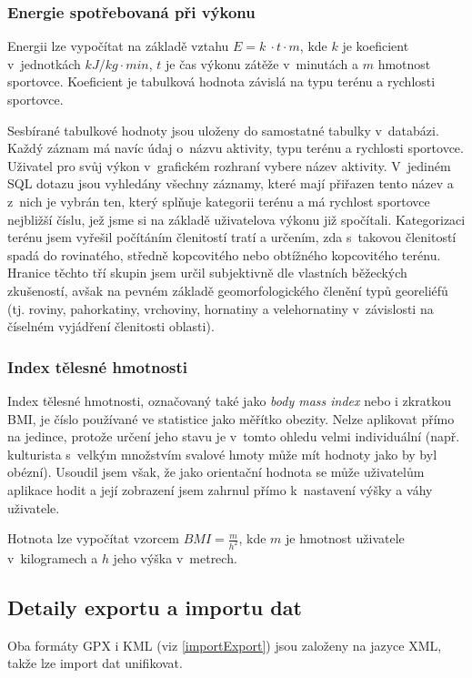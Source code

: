\subsubsection{Energie spotřebovaná při výkonu}
Energii lze vypočítat na základě vztahu $E = k~\cdot t \cdot m$, kde
$k$ je koeficient v~jednotkách $kJ / kg \cdot min$,
$t$ je čas výkonu zátěže v~minutách a $m$
hmotnost sportovce. Koeficient je tabulková hodnota závislá na typu
terénu a rychlosti sportovce.

Sesbírané tabulkové hodnoty jsou uloženy do samostatné tabulky
v~databázi. Každý záznam má navíc údaj o~názvu aktivity, typu terénu a
rychlosti sportovce. Uživatel pro svůj výkon v~grafickém rozhraní
vybere název aktivity. V~jediném SQL dotazu jsou vyhledány všechny
záznamy, které mají přiřazen tento název a z~nich je vybrán ten,
který splňuje kategorii terénu a má rychlost sportovce nej\-bližší
číslu, jež jsme si na základě uživatelova výkonu již spočítali.
Kategorizaci terénu jsem vyřešil počítáním členitostí tratí a určením,
zda s~takovou členitostí spadá do rovinatého, středně kopcovitého
nebo obtížného kopcovitého terénu. Hranice těchto tří skupin jsem
určil subjektivně dle vlastních běžeckých zkušeností, avšak na
pevném základě geomorfologického členění typů georeliéfů (tj. roviny,
pahorkatiny, vrchoviny, hornatiny a velehornatiny v~závislosti na
číselném vyjádření členitosti oblasti).

\subsubsection{Index tělesné hmotnosti}
Index tělesné hmotnosti, označovaný také jako {\it body mass index}
nebo i zkratkou BMI, je číslo používané ve statistice jako měřítko
obezity. Nelze aplikovat přímo na jedince, protože určení jeho stavu
je v~tomto ohledu velmi individuální (např. kulturista s~velkým
množstvím svalové hmoty může mít hodnoty jako by byl obézní). Usoudil
jsem však, že jako orientační hodnota se může uživatelům aplikace
hodit a její zobrazení jsem zahrnul přímo k~nastavení výšky a váhy
uživatele.

Hotnota lze vypočítat vzorcem $BMI = \frac{m}{h^2}$, kde
$m$ je hmotnost uživatele v~kilogramech a $h$ jeho výška
v~metrech.

\subsection{Detaily exportu a importu dat}
Oba formáty GPX i KML (viz \ref{importExport}) jsou založeny na
jazyce XML, takže lze import dat unifikovat.


